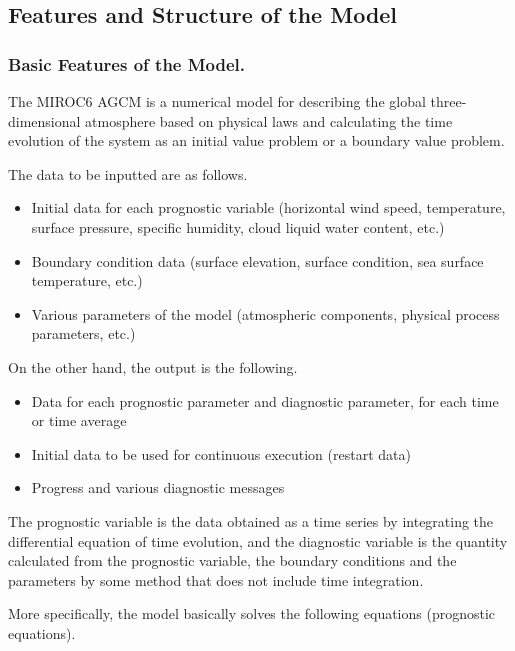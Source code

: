 \hypertarget{features-and-structure-of-the-model}{%
\subsection{Features and Structure of the Model}\label{features-and-structure-of-the-model}}

\hypertarget{basic-features-of-the-model.}{%
\subsubsection{Basic Features of the Model.}\label{basic-features-of-the-model.}}

The MIROC6 AGCM is a numerical model for describing the global three-dimensional atmosphere based on physical laws and calculating the time evolution of the system as an initial value problem or a
boundary value problem.

The data to be inputted are as follows.

\begin{itemize}
\item
  Initial data for each prognostic variable (horizontal wind speed, temperature, surface pressure, specific humidity, cloud liquid water content, etc.)
\item
  Boundary condition data (surface elevation, surface condition, sea surface temperature, etc.)
\item
  Various parameters of the model (atmospheric components, physical process parameters, etc.)
\end{itemize}

On the other hand, the output is the following.

\begin{itemize}
\item
  Data for each prognostic parameter and diagnostic parameter, for each time or time average
\item
  Initial data to be used for continuous execution (restart data)
\item
  Progress and various diagnostic messages
\end{itemize}

The prognostic variable is the data obtained as a time series by integrating the differential equation of time evolution, and the diagnostic variable is the quantity calculated from the prognostic
variable, the boundary conditions and the parameters by some method that does not include time integration.

More specifically, the model basically solves the following equations (prognostic equations).

